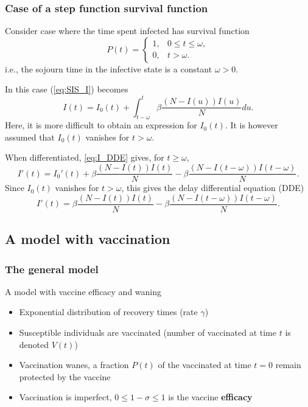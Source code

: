 \documentclass[aspectratio=169]{beamer}\usepackage[]{graphicx}\usepackage[]{xcolor}
\begin{document}
\begin{frame}\frametitle{Case of a step function survival function}
Consider case where the time spent infected has survival function 
\[
P(t)=\begin{cases}
1, & 0\leq t\leq\omega,\\
0, & t>\omega.
\end{cases}
\]
i.e., the sojourn time in the infective state is a constant
$\omega>0$.
 
In this case (\ref{eq:SIS_I}) becomes
\begin{equation}\label{eq:I_DDE}
I(t)=I_0(t)+\int_{t-\omega}^t \beta\frac{(N-I(u))I(u)}{N} du.
\end{equation}
Here, it is more difficult to obtain an expression for $I_0(t)$. It is however
assumed that $I_0(t)$ vanishes for $t>\omega$.
\end{frame}

\begin{frame}
When differentiated, \eqref{eq:I_DDE} gives, for $t\geq\omega$,
\[
I'(t)=I_0'(t)+\beta\frac{(N-I(t))I(t)}{N}
-\beta\frac{\left(N-I(t-\omega)\right)I(t-\omega)}{N}.
\]
Since $I_0(t)$ vanishes for $t>\omega$, this gives the delay
differential equation (DDE)
\[
I'(t)=\beta\frac{(N-I(t))I(t)}{N}
-\beta\frac{(N-I(t-\omega))I(t-\omega)}{N}.
\]
\end{frame}



\subsection{A model with vaccination}


\subsubsection{The general model}

\begin{frame}{A model with vaccine efficacy and waning}
\begin{itemize}
\item Exponential distribution of recovery times (rate $\gamma$)
\vfill
\item Susceptible individuals are vaccinated (number of vaccinated at time $t$ is denoted $V(t)$)
\vfill
\item Vaccination wanes, a fraction $P(t)$ of the vaccinated at time $t=0$ remain protected by the vaccine
\vfill
\item Vaccination is imperfect, $0\leq 1-\sigma\leq 1$ is the vaccine \textbf{efficacy}
\end{itemize}
\end{frame}
\end{document}
